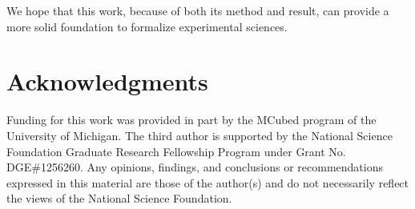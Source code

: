 \documentclass[review]{elsarticle}
\theoremstyle{plain}%
\theoremstyle{definition}
\theoremstyle{remark}
\begin{document}
We hope that this work, because of both its method and result, can provide a more solid foundation to formalize experimental sciences.


\section*{Acknowledgments}
Funding for this work was provided in part by the MCubed program of the University of Michigan. The third author is supported by the National Science Foundation Graduate Research Fellowship Program under Grant No. DGE\#1256260. Any opinions, findings, and conclusions or recommendations expressed in this material are those of the author(s) and do not necessarily reflect the views of the National Science Foundation.



\end{document}

